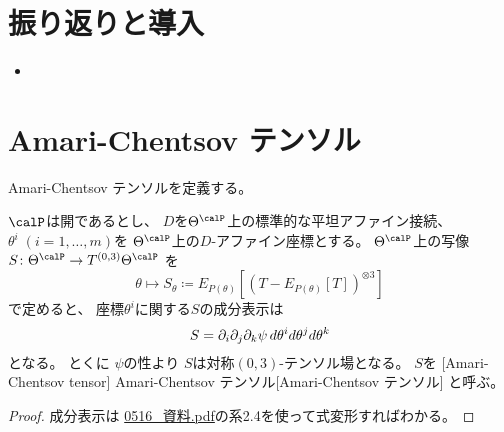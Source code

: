 \documentclass[report]{jlreq}
\begin{document}
%

%
\section*{振り返りと導入}

\begin{itemize}
    \item \TODO{}
\end{itemize}

%
\section{Amari-Chentsov テンソル}

Amari-Chentsov テンソルを定義する。

\begin{propdef}
    $\calP$は開であるとし、
    $D$を$\Theta^\calP$上の標準的な平坦アファイン接続、
    $\theta^i \; (i = 1, \dots, m)$を
    $\Theta^\calP$上の$D$-アファイン座標とする。
    $\Theta^\calP$上の写像
    $S \colon \Theta^\calP \to T^{(0, 3)} \Theta^\calP$
    を
    \begin{equation}
        \theta
            \mapsto
                S_\theta
                \coloneqq
                E_{P(\theta)}[
                    (T - E_{P(\theta)}[T])^{\otimes 3}
                ]
    \end{equation}
    で定めると、
    座標$\theta^i$に関する$S$の成分表示は
    \begin{equation}
        S
            = \partial_i \partial_j \partial_k \psi \, d\theta^i d\theta^j d\theta^k
    \end{equation}
    となる。
    とくに
    $\psi$の\smooth 性より
    $S$は対称$(0, 3)$-テンソル場となる。
    $S$を
    [Amari-Chentsov tensor]
        {Amari-Chentsov テンソル}[Amari-Chentsov テンソル]
    と呼ぶ。
\end{propdef}

\begin{proof}
    成分表示は
    \url{0516_資料.pdf}の系2.4を使って式変形すればわかる。
\end{proof}
\end{document}
